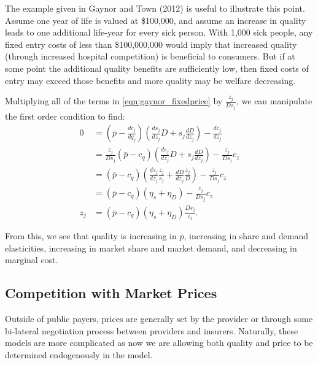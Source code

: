 \documentclass[
  letterpaper,
  DIV=11,
  numbers=noendperiod]{scrreport}
\theoremstyle{definition}
\theoremstyle{remark}
\begin{document}
The example given in Gaynor and Town (2012) is useful to illustrate this
point. Assume one year of life is valued at \$100,000, and assume an
increase in quality leads to one additional life-year for every sick
person. With 1,000 sick people, any fixed entry costs of less than
\$100,000,000 would imply that increased quality (through increased
hospital competition) is beneficial to consumers. But if at some point
the additional quality benefits are sufficiently low, then fixed costs
of entry may exceed those benefits and more quality may be welfare
decreasing.

Multiplying all of the terms in \ref{eqn:gaynor_fixedprice} by
\(\frac{z_{j}}{D s_{j}}\), we can manipulate the first order condition
to find: \[\begin{align*}
0 &= \left(\bar{p} - \frac{d c_{j}}{d q_{j}} \right) \left(\frac{d s_{j}}{d z_{j}}D + s_{j}\frac{d D}{d z_{j}} \right) - \frac{d c_{j}}{d z_{j}} \\
 &= \frac{z_{j}}{D s_{j}} \left(\bar{p} - c_{q} \right) \left(\frac{d s_{j}}{d z_{j}}D + s_{j}\frac{d D}{d z_{j}} \right) - \frac{z_{j}}{D s_{j}} c_{z} \\
 &= \left(\bar{p} - c_{q} \right) \left(\frac{d s_{j}}{d z_{j}}\frac{z_{j}}{s_{j}} + \frac{d D}{d z_{j}}\frac{z_{j}}{D} \right) - \frac{z_{j}}{D s_{j}} c_{z} \\
 &= \left(\bar{p} - c_{q} \right) \left(\eta_{s} + \eta_{D} \right) - \frac{z_{j}}{D s_{j}} c_{z} \\
z_{j} &= \left(\bar{p} - c_{q} \right) \left(\eta_{s} + \eta_{D} \right) \frac{D s_{j}}{c_{z}}.
\end{align*}\]

From this, we see that quality is increasing in \(\bar{p}\), increasing
in share and demand elasticities, increasing in market share and market
demand, and decreasing in marginal cost.

\hypertarget{competition-with-market-prices}{%
\subsection{Competition with Market
Prices}\label{competition-with-market-prices}}

Outside of public payers, prices are generally set by the provider or
through some bi-lateral negotiation process between providers and
insurers. Naturally, these models are more complicated as now we are
allowing both quality and price to be determined endogenously in the
model.
\end{document}
